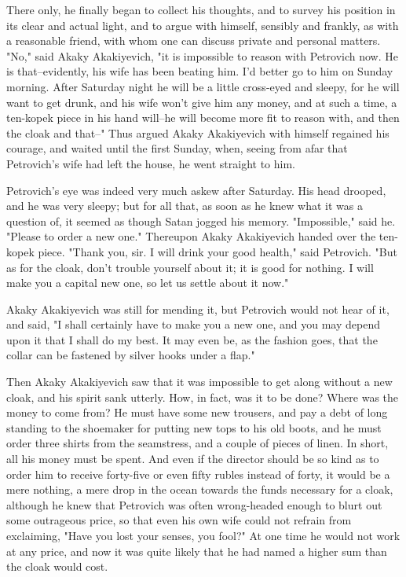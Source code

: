 There only, he finally began to collect his thoughts, and to survey
his position in its clear and actual light, and to argue with himself,
sensibly and frankly, as with a reasonable friend, with whom one can
discuss private and personal matters. "No," said Akaky Akakiyevich,
"it is impossible to reason with Petrovich now. He is that--evidently,
his wife has been beating him. I'd better go to him on Sunday morning.
After Saturday night he will be a little cross-eyed and sleepy, for he
will want to get drunk, and his wife won't give him any money, and at
such a time, a ten-kopek piece in his hand will--he will become more
fit to reason with, and then the cloak and that--" Thus argued Akaky
Akakiyevich with himself regained his courage, and waited until the
first Sunday, when, seeing from afar that Petrovich's wife had left
the house, he went straight to him.

Petrovich's eye was indeed very much askew after Saturday. His head
drooped, and he was very sleepy; but for all that, as soon as he knew
what it was a question of, it seemed as though Satan jogged his
memory. "Impossible," said he. "Please to order a new one." Thereupon
Akaky Akakiyevich handed over the ten-kopek piece. "Thank you, sir. I
will drink your good health," said Petrovich. "But as for the cloak,
don't trouble yourself about it; it is good for nothing. I will make
you a capital new one, so let us settle about it now."

Akaky Akakiyevich was still for mending it, but Petrovich would not
hear of it, and said, "I shall certainly have to make you a new one,
and you may depend upon it that I shall do my best. It may even be, as
the fashion goes, that the collar can be fastened by silver hooks
under a flap."

Then Akaky Akakiyevich saw that it was impossible to get along without
a new cloak, and his spirit sank utterly. How, in fact, was it to be
done? Where was the money to come from? He must have some new
trousers, and pay a debt of long standing to the shoemaker for putting
new tops to his old boots, and he must order three shirts from the
seamstress, and a couple of pieces of linen. In short, all his money
must be spent. And even if the director should be so kind as to order
him to receive forty-five or even fifty rubles instead of forty, it
would be a mere nothing, a mere drop in the ocean towards the funds
necessary for a cloak, although he knew that Petrovich was often
wrong-headed enough to blurt out some outrageous price, so that even
his own wife could not refrain from exclaiming, "Have you lost your
senses, you fool?" At one time he would not work at any price, and now
it was quite likely that he had named a higher sum than the cloak
would cost.

